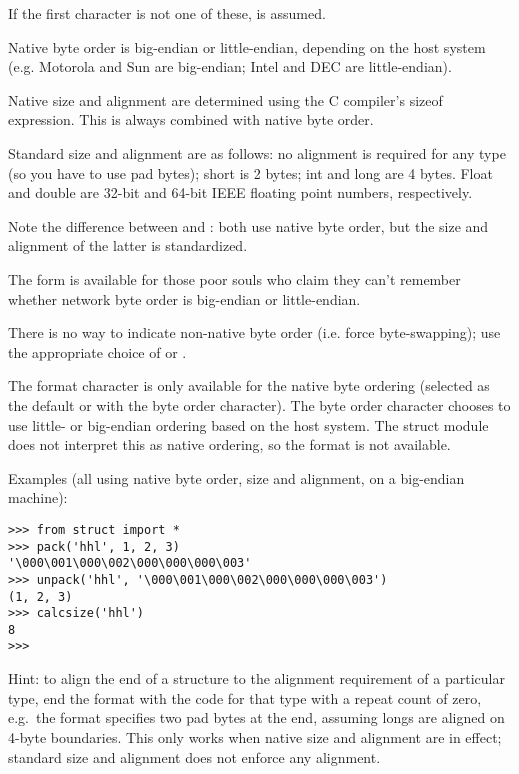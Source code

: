 If the first character is not one of these,  is assumed.

Native byte order is big-endian or little-endian, depending on the
host system (e.g. Motorola and Sun are big-endian; Intel and DEC are
little-endian).

Native size and alignment are determined using the C compiler's sizeof
expression.  This is always combined with native byte order.

Standard size and alignment are as follows: no alignment is required
for any type (so you have to use pad bytes); short is 2 bytes; int and
long are 4 bytes.  Float and double are 32-bit and 64-bit IEEE floating
point numbers, respectively.

Note the difference between  and \character{=}: both use native
byte order, but the size and alignment of the latter is standardized.

The form \character{!} is available for those poor souls who claim they
can't remember whether network byte order is big-endian or
little-endian.

There is no way to indicate non-native byte order (i.e. force
byte-swapping); use the appropriate choice of \character{<} or
\character{>}.

The  format character is only available for the native
byte ordering (selected as the default or with the  byte
order character). The byte order character \character{=} chooses to
use little- or big-endian ordering based on the host system. The
struct module does not interpret this as native ordering, so the
 format is not available.

Examples (all using native byte order, size and alignment, on a
big-endian machine):

\begin{verbatim}
>>> from struct import *
>>> pack('hhl', 1, 2, 3)
'\000\001\000\002\000\000\000\003'
>>> unpack('hhl', '\000\001\000\002\000\000\000\003')
(1, 2, 3)
>>> calcsize('hhl')
8
>>> 
\end{verbatim}
%
Hint: to align the end of a structure to the alignment requirement of
a particular type, end the format with the code for that type with a
repeat count of zero, e.g.\ the format  specifies two
pad bytes at the end, assuming longs are aligned on 4-byte boundaries.
This only works when native size and alignment are in effect;
standard size and alignment does not enforce any alignment.

\begin{seealso}
\end{seealso}
